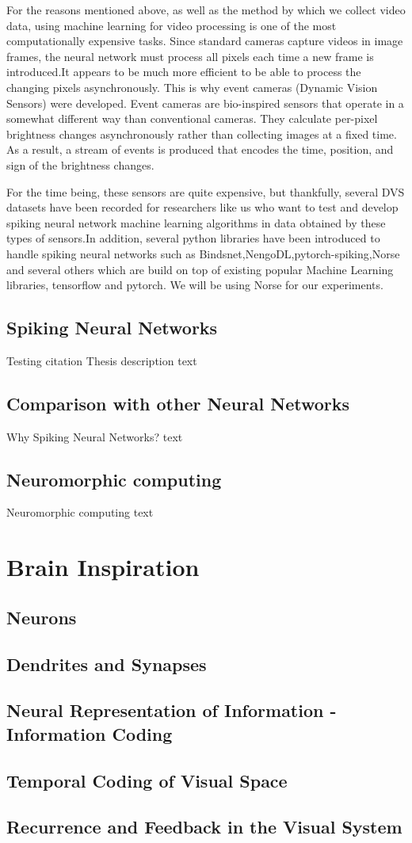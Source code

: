 \documentclass{report}
\begin{document}
For the reasons mentioned above, as well as the method by which we collect video data, using machine learning for video processing is one of the most computationally expensive tasks. Since standard cameras capture videos in image frames, the neural network must process all pixels each time a new frame is introduced.It appears to be much more efficient to be able to process the changing pixels asynchronously. This is why event cameras (Dynamic Vision Sensors) were developed. Event cameras are bio-inspired sensors that operate in a somewhat different way than conventional cameras. They calculate per-pixel brightness changes asynchronously rather than collecting images at a fixed time. As a result, a stream of events is produced that encodes the time, position, and sign of the brightness changes.

For the time being, these sensors are quite expensive, but thankfully, several DVS datasets have been recorded for researchers like us who want to test and develop spiking neural network machine learning algorithms in data obtained by these types of sensors.In addition, several python libraries have been introduced to handle spiking neural networks such as Bindsnet,NengoDL,pytorch-spiking,Norse and several others which are build on top of existing popular Machine Learning libraries, tensorflow and pytorch. We will be using Norse for our experiments.

\section{Spiking Neural Networks}
Testing citation   \cite{Esser2016}
Thesis description text
\section{Comparison with other Neural Networks}

Why Spiking Neural Networks? text

\section{Neuromorphic computing}

Neuromorphic computing text

\chapter{Brain Inspiration}
\section{Neurons}
\section{Dendrites and Synapses}
\section{Neural Representation of Information - Information Coding}
\section{Temporal Coding of Visual Space}
\section{Recurrence and Feedback in the Visual System}




\end{document}
